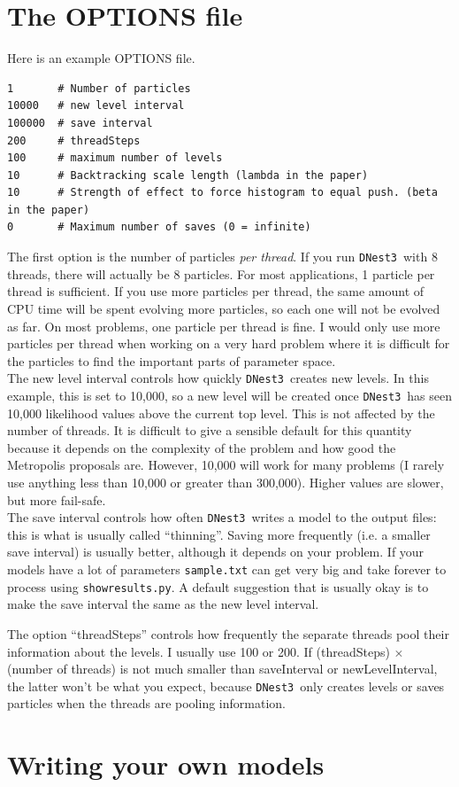 \documentclass[a4paper, 11pt]{article}
\newcommand{\dnest}{{\tt DNest3}}
\begin{document}
\section{The OPTIONS file}\label{sec:options}
Here is an example OPTIONS file.
\begin{framed}
\begin{verbatim}
1       # Number of particles
10000   # new level interval
100000  # save interval
200     # threadSteps
100     # maximum number of levels
10      # Backtracking scale length (lambda in the paper)
10      # Strength of effect to force histogram to equal push. (beta in the paper)
0       # Maximum number of saves (0 = infinite)
\end{verbatim}
\end{framed}

The first option is the number of particles {\it per thread}. If you run
\dnest~with 8 threads, there will actually be 8 particles. For most
applications, 1 particle per thread is sufficient. If you use more particles
per thread, the same amount of CPU time will be spent evolving more particles,
so each one will not be evolved as far. On most problems, one particle per
thread is fine. I would only use more particles per thread when working on
a very hard problem where it is difficult for the particles to find the
important parts of parameter space.\\

The new level interval controls how quickly \dnest~creates new levels. In this
example, this is set to 10,000, so a new level will be created once \dnest~has
seen 10,000 likelihood values above the current top level. This is not affected by
the number of threads. It is difficult to give a sensible default for this
quantity because it depends on the complexity of the problem and how good
the Metropolis proposals are. However, 10,000
will work for many problems (I rarely use anything less than 10,000 or greater
than 300,000). Higher values are slower, but more fail-safe.\\

The save interval controls how often \dnest~writes a model to the output
files: this is what is usually called ``thinning''. Saving more frequently
(i.e. a smaller save interval) is usually better, although it depends on your
problem. If your models have a lot of parameters {\tt sample.txt} can get
very big and take forever to process using {\tt showresults.py}. A default
suggestion that is usually okay is to make the save interval the same as the
new level interval.

The option ``threadSteps'' controls how frequently the separate threads pool
their information about the levels. I usually use 100 or 200. If
(threadSteps) $\times$ (number of threads) is not much smaller than
saveInterval or newLevelInterval, the latter won't be what you expect, because
\dnest~only creates levels or saves particles when the threads are pooling
information.

\section{Writing your own models}
\end{document}
